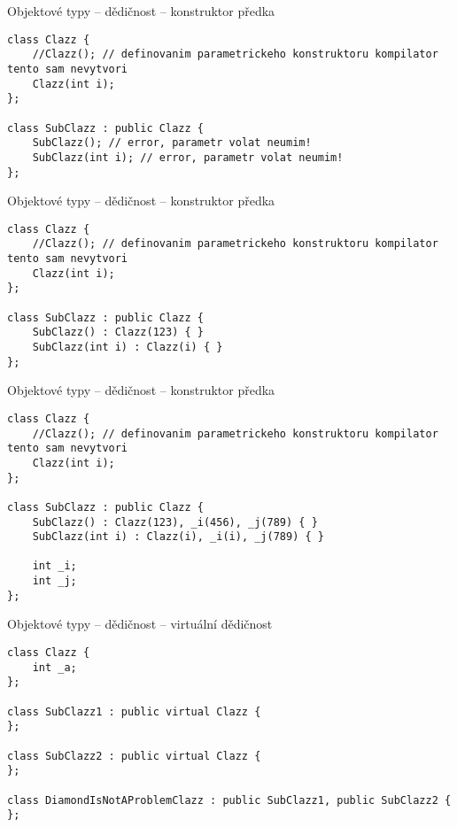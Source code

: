 \begin{frame}[fragile]
\begin{exampleblock}{Objektové typy -- dědičnost -- konstruktor předka} 
\begin{lstlisting}
class Clazz { 
	//Clazz(); // definovanim parametrickeho konstruktoru kompilator tento sam nevytvori
	Clazz(int i);
};

class SubClazz : public Clazz { 
	SubClazz(); // error, parametr volat neumim!
	SubClazz(int i); // error, parametr volat neumim!
};
\end{lstlisting}
\end{exampleblock}
\end{frame}


\begin{frame}[fragile]
\begin{exampleblock}{Objektové typy -- dědičnost -- konstruktor předka} 
\begin{lstlisting}
class Clazz { 
	//Clazz(); // definovanim parametrickeho konstruktoru kompilator tento sam nevytvori
	Clazz(int i);
};

class SubClazz : public Clazz { 
	SubClazz() : Clazz(123) { }
	SubClazz(int i) : Clazz(i) { }
};
\end{lstlisting}
\end{exampleblock}
\end{frame}



\begin{frame}[fragile]
\begin{exampleblock}{Objektové typy -- dědičnost -- konstruktor předka} 
\begin{lstlisting}
class Clazz { 
	//Clazz(); // definovanim parametrickeho konstruktoru kompilator tento sam nevytvori
	Clazz(int i);
};

class SubClazz : public Clazz { 
	SubClazz() : Clazz(123), _i(456), _j(789) { }
	SubClazz(int i) : Clazz(i), _i(i), _j(789) { }
	
	int _i;
	int _j;
};
\end{lstlisting}
\end{exampleblock}
\end{frame}


\begin{frame}[fragile]
\begin{exampleblock}{Objektové typy -- dědičnost -- virtuální dědičnost} 
\begin{lstlisting}
class Clazz {
	int _a;
};

class SubClazz1 : public virtual Clazz { 
};

class SubClazz2 : public virtual Clazz {
};

class DiamondIsNotAProblemClazz : public SubClazz1, public SubClazz2 { 
};
\end{lstlisting}
\end{exampleblock}
\end{frame}



